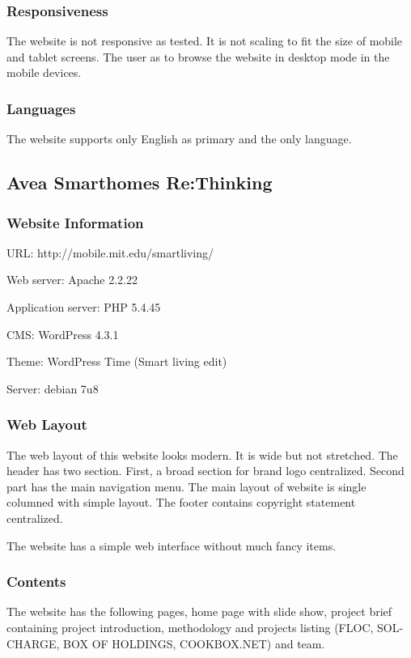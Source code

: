 \subsubsection*{Responsiveness}
The website is not responsive as tested. It is not scaling to fit the size of mobile and tablet screens. The user as to browse the website in desktop mode in the mobile devices.

\subsubsection*{Languages}
The website supports only English as primary and the only language.

\subsection{Avea Smarthomes Re:Thinking}
\subsubsection*{Website Information}
\begin{itemize*}
\item URL: http://mobile.mit.edu/smartliving/
\item Web server: Apache 2.2.22
\item Application server: PHP 5.4.45
\item CMS: WordPress 4.3.1
\item Theme: WordPress Time (Smart living edit)
\item Server: debian 7u8
\end{itemize*}

\subsubsection*{Web Layout}
The web layout of this website \cite{FedericoCasalegno.2014} looks modern. It is wide but not stretched. The header has two section. First, a broad section for brand logo centralized. Second part has the main navigation menu. The main layout of website is single columned with simple layout. The footer contains copyright statement centralized.

The website has a simple web interface without much fancy items.

\subsubsection*{Contents}
The website has the following pages, home page with slide show, project brief containing project introduction, methodology and projects listing (FLOC, SOL-CHARGE, BOX OF HOLDINGS, COOKBOX.NET) and team.

